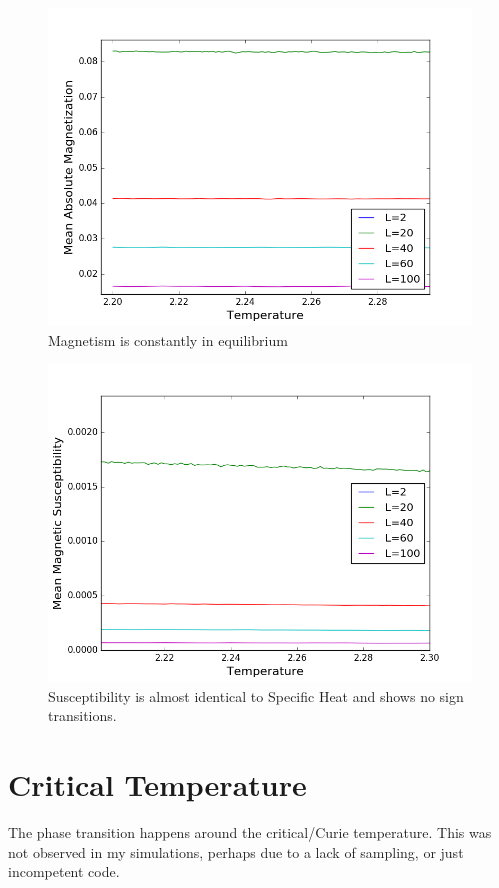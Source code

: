 \documentclass[%
oneside,                 %
final,                   %
10pt]{article}
\begin{document}
\begin{figure}
\includegraphics[scale=0.5]{mag}
\caption{Magnetism is constantly in equilibrium}
\label{low}
\end{figure}
\begin{figure}
\includegraphics[scale=0.5]{susceptibility} 
\caption{Susceptibility is almost identical to Specific Heat and shows no sign transitions.}
\label{high}
\end{figure}

\section{Critical Temperature}
The phase transition happens around the critical/Curie temperature.
This was not observed in my simulations, perhaps due to a lack of sampling, or just incompetent code.
\end{document}
